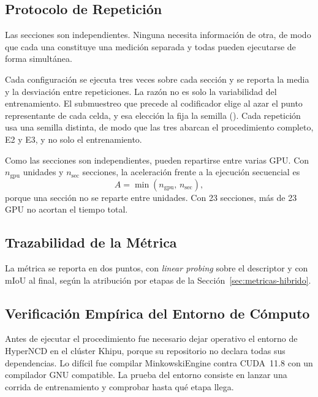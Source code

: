 \FloatBarrier
\subsection{Protocolo de Repetición}
\label{sec:repeticiones}

Las secciones son independientes. Ninguna necesita información de otra, de modo
que cada una constituye una medición separada y todas pueden ejecutarse de forma
simultánea.

Cada configuración se ejecuta tres veces sobre cada sección y se reporta la
media y la desviación entre repeticiones. La razón no es solo la variabilidad
del entrenamiento. El submuestreo que precede al codificador elige al azar el
punto representante de cada celda, y esa elección la fija la semilla
(). Cada
repetición usa una semilla distinta, de modo que las tres abarcan el
procedimiento completo, E2 y E3, y no solo el entrenamiento.

Como las secciones son independientes, pueden repartirse entre varias GPU. Con
$n_{\mathrm{gpu}}$ unidades y $n_{\mathrm{sec}}$ secciones, la aceleración frente
a la ejecución secuencial es
\begin{equation}
A=\min\left(n_{\mathrm{gpu}},\,n_{\mathrm{sec}}\right),
\label{eq:aceleracion}
\end{equation}
porque una sección no se reparte entre unidades. Con 23 secciones, más de 23
GPU no acortan el tiempo total.

\FloatBarrier
\subsection{Trazabilidad de la Métrica}
\label{sec:trazabilidad}

La métrica se reporta en dos puntos, con \emph{linear probing} sobre el
descriptor y con mIoU al final, según la atribución por etapas de la
Sección~\ref{sec:metricas-hibrido}.

\FloatBarrier
\subsection{Verificación Empírica del Entorno de Cómputo}
\label{sec:entorno-computo}

Antes de ejecutar el procedimiento fue necesario dejar operativo el entorno de
HyperNCD en el clúster Khipu, porque su repositorio no declara todas sus
dependencias. Lo difícil fue compilar MinkowskiEngine contra CUDA~11.8 con un
compilador GNU compatible. La prueba del entorno consiste en lanzar una
corrida de entrenamiento y comprobar hasta qué etapa llega.

